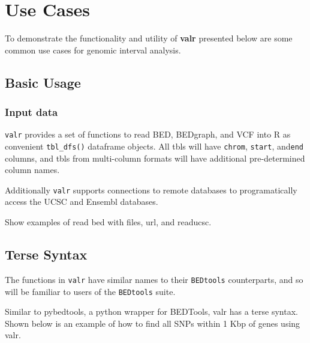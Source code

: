 \documentclass[9pt,a4paper]{extarticle}
\begin{document}
\section*{Use Cases} %
To demonstrate the functionality and utility of \textbf{valr} presented below are some common use cases for genomic interval analysis. 

\subsection{Basic Usage}

\subsubsection{Input data}\label{input-data}

\texttt{valr} provides a set of functions to read BED, BEDgraph, and VCF into R as convenient \texttt{tbl\_dfs()} dataframe objects. All tbls will have \texttt{chrom}, \texttt{start}, and\texttt{end} columns, and tbls from multi-column formats will have additional pre-determined column names. 

Additionally \texttt{valr} supports connections to remote databases to programatically access the UCSC and Ensembl databases. 

Show examples of read bed with files, url, and readucsc.

\subsection{Terse Syntax}

The functions in \texttt{valr} have similar names to their
\texttt{BEDtools} counterparts, and so will be familiar to users of
the \texttt{BEDtools} suite. 

Similar to pybedtools\cite{dale_pybedtools:_2011}, a python wrapper for BEDTools, valr has a terse syntax. Shown below is an example of how to find all SNPs within 1 Kbp of genes using valr.
\end{document}
